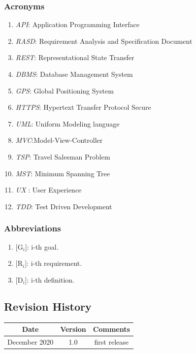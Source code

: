 \documentclass[a4paper, 12pt, oneside, table]{article}
\begin{document}
\subsubsection{Acronyms}
\begin{enumerate}[label={A.\arabic{*}}]
\item \label{def:API}\textit{API}: Application Programming Interface
\item \label{def:RASD}\textit{RASD}: Requirement Analysis and Specification Document
\item \label{def:REST}\textit{REST}: Representational State Transfer
\item \label{def:DBMS}\textit{DBMS}: Database Management System
\item \label{def:GPS} \textit{GPS}: Global Positioning System
\item \label{def:HTTPS}\textit{HTTPS}: Hypertext Transfer Protocol Secure
\item \label{def:UML}\textit{UML}: Uniform Modeling language
\item \label{def:MVC}\textit{MVC}:Model-View-Controller
\item \label{def:TSP} \textit{TSP}: Travel Salesman Problem
\item \label{def:MST} \textit{MST}: Minimum Spanning Tree
\item \label{def:UX}\textit{UX} : User Experience
\item \label{def:TDD} \textit{TDD}: Test Driven Development
\end{enumerate}

\subsubsection{Abbreviations}
\begin{enumerate}[label={AB.\arabic{*}}]
\item $[$G$_i]$: i-th goal.
\item $[$R$_i]$: i-th requirement.
\item $[$D$_i]$: i-th definition.
\end{enumerate}

\subsection{Revision History}
\begin{center}
 \begin{tabular}{||c c c||}
 \hline
 Date & Version & Comments \\ [0.5ex] 
 \hline\hline
 December 2020 & 1.0 & first release \\ 
 \hline
 \hline
\end{tabular}
\end{center}
\end{document}
